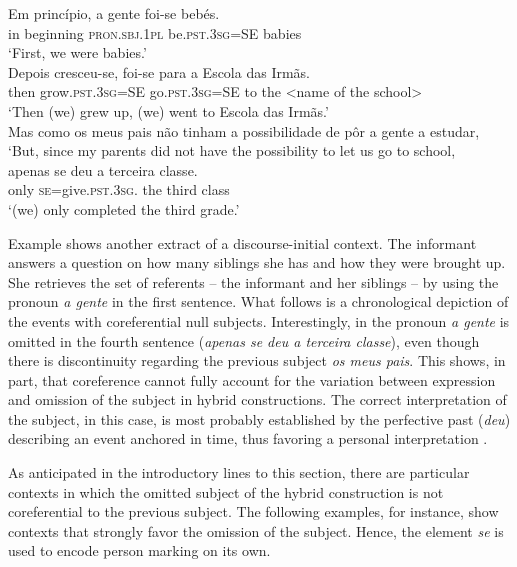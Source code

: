 \documentclass[output=paper]{langscibook}
\begin{document}
\ea\label{ex:henriques:38}
 \gll Em princípio, {a gente} foi-se bebés.\\
      in beginning \textsc{pron.sbj.1pl} be.\textsc{pst.3sg}=SE babies\\
 \glt `First, we were babies.'\\
 \gll Depois cresceu-se, foi-se para a {Escola das Irmãs}.\\
      then grow.\textsc{pst.3sg}=SE go.\textsc{pst.3sg}=SE to the {<name of the school>}\\
 \glt `Then (we) grew up, (we) went to Escola das Irmãs.'\\
       Mas como os meus pais não tinham a possibilidade de pôr a gente a estudar,\\
 \glt `But, since my parents did not have the possibility to let us go to school,\\
 \gll apenas {se deu} a terceira classe.\\
      only \textsc{se=}give.\textsc{pst.3sg.} the third class\\
 \glt `(we) only completed the third grade.' 
\z 

Example  shows another extract of a discourse-initial context. The informant answers a question on how many siblings she has and how they were brought up. She retrieves the set of referents  -- the informant and her siblings --  by using the pronoun \textit{a gente} in the first sentence. What follows is a chronological depiction of the events with coreferential null subjects. Interestingly, in  the pronoun \textit{a gente} is omitted in the fourth sentence (\textit{apenas se deu a terceira classe}), even though there is discontinuity regarding the previous subject \textit{os meus pais}. This shows, in part, that coreference cannot fully account for the variation between expression and omission of the subject in hybrid constructions. The correct interpretation of the   subject, in this case, is most probably established by the perfective past (\textit{deu}) describing an event anchored in time, thus favoring a personal interpretation \citep{Siewierska2011}.


As anticipated in the introductory lines to this section, there are particular contexts in which the omitted subject of the hybrid construction is not coreferential to the previous subject. The following examples, for instance, show contexts that strongly favor the omission of the subject. Hence, the element \textit{se} is used to encode  person marking on its own. 
\end{document}
